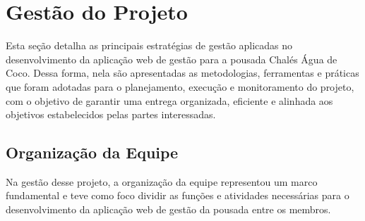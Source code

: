 \documentclass[
	12pt,				%
	openany,			%
	twoside,			%
	a4paper,			%
	english,			%
	french,				%
	spanish,			%
	brazil				%
	]{abntex2}
\begin{document}

\chapter{Gestão do Projeto}
Esta seção detalha as principais estratégias de gestão aplicadas no desenvolvimento da aplicação web de gestão para a pousada Chalés Água de Coco. Dessa forma, nela são apresentadas as metodologias, ferramentas e práticas que foram adotadas para o planejamento, execução e monitoramento do projeto, com o objetivo de garantir uma entrega organizada, eficiente e alinhada aos objetivos estabelecidos pelas partes interessadas.
\section{Organização da Equipe}
  Na gestão desse projeto, a organização da equipe representou um marco fundamental e teve como foco dividir as funções e atividades necessárias para o desenvolvimento da aplicação web de gestão da pousada entre os membros.%
\end{document}
